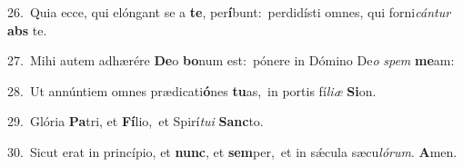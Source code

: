 {\numbfont\textcolor{\numbcolor}{26.}}~Quia ecce, qui elóngant se a \textbf{te}\-, per\-\textbf{í}\-bunt:~\star perdidísti omnes, qui forni\-\textit{cán}\-\textit{tur} \textbf{abs} te.\par
{\numbfont\textcolor{\numbcolor}{27.}}~Mihi autem adhærére \textbf{De}\-o \textbf{bo}\-num est:~\star pónere in Dómino De\textit{o} \textit{spem} \textbf{me}\-am:\par
{\numbfont\textcolor{\numbcolor}{28.}}~Ut annúntiem omnes prædicati\-\textbf{ó}\-nes \textbf{tu}\-as,~\star in portis fí\-\textit{li}\-\textit{æ} \textbf{Si}\-on.\par
{\numbfont\textcolor{\numbcolor}{29.}}~Glória \textbf{Pa}\-tri, et \textbf{Fí}\-lio,~\star et Spirí\-\textit{tu}\-\textit{i} \textbf{Sanc}\-to.\par
{\numbfont\textcolor{\numbcolor}{30.}}~Sicut erat in princípio, et \textbf{nunc}\-, et \textbf{sem}\-per,~\star et in sǽcula sæcu\-\textit{ló}\-\textit{rum}. \textbf{A}\-men.\par
